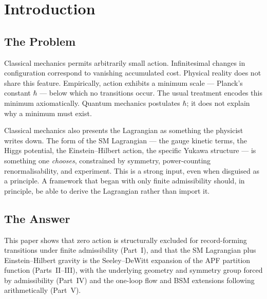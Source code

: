 \documentclass[11pt]{article}
\theoremstyle{definition}
\begin{document}
\begin{abstract}
We frame the quantum-of-action theorem as PLEC's MD component made sharp, and the spectral-action identity as PLEC's variational content made explicit.  The four structurally necessary PLEC components --- A1 (finite upper bound), MD (cost floor), A2 (argmin selection), BW (budget-window non-degeneracy) --- each do independent work and are inventoried in Appendix~C.  Full formal proofs appear in the accompanying Technical Supplement v1.0.
\end{abstract}

\tableofcontents
\vspace{1em}

\section{Introduction}\label{sec:intro}

\subsection{The Problem}
Classical mechanics permits arbitrarily small action.  Infinitesimal changes in configuration correspond to vanishing accumulated cost.  Physical reality does not share this feature.  Empirically, action exhibits a minimum scale --- Planck's constant $\hbar$ --- below which no transitions occur.  The usual treatment encodes this minimum axiomatically.  Quantum mechanics postulates $\hbar$; it does not explain why a minimum must exist.

Classical mechanics also presents the Lagrangian as something the physicist writes down.  The form of the SM Lagrangian --- the gauge kinetic terms, the Higgs potential, the Einstein--Hilbert action, the specific Yukawa structure --- is something one \emph{chooses}, constrained by symmetry, power-counting renormalisability, and experiment.  This is a strong input, even when disguised as a principle.  A framework that began with only finite admissibility should, in principle, be able to derive the Lagrangian rather than import it.

\subsection{The Answer}
This paper shows that zero action is structurally excluded for record-forming transitions under finite admissibility (Part~I), and that the SM Lagrangian plus Einstein--Hilbert gravity is the Seeley--DeWitt expansion of the APF partition function (Parts~II--III), with the underlying geometry and symmetry group forced by admissibility (Part~IV) and the one-loop flow and BSM extensions following arithmetically (Part~V).
\end{document}
